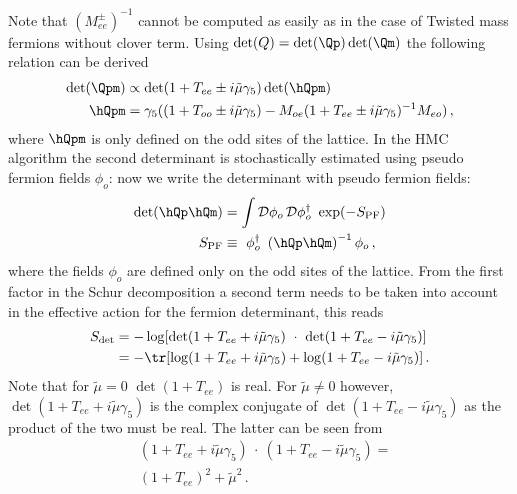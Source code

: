 Note that $(M_{ee}^\pm)^{-1}$ cannot be computed as easily as in the
case of Twisted mass fermions without clover term.
Using $\det(Q)=\det(\Qp)\det(\Qm)$ the following relation can be derived
\begin{equation}
  \label{eq:eosw4}
  \begin{split}
    \det(\Qpm) &\propto \det(1+T_{ee} \pm i\tilde\mu\gamma_5)\det(\hQpm) \\
    \hQpm &= \gamma_5((1 + T_{oo} \pm i\tilde\mu\gamma_5) -
             M_{oe}( 1 + T_{ee} \pm i\tilde\mu\gamma_5 )^{-1}M_{eo})\, ,
  \end{split}
\end{equation}
where $\hQpm$ is only defined on the odd sites of the lattice. In the
HMC algorithm the second determinant is stochastically estimated using
pseudo fermion fields $\phi_o$: now we write the determinant with
pseudo fermion fields:
\begin{equation}
  \begin{split}
    \det(\hQp \hQm) &= \int \mathcal{D}\phi_o\,\mathcal{D}\phi^\dagger_o\
    \exp(-S_\mathrm{PF})\\
    S_\mathrm{PF} &\equiv\ \phi_o^\dagger\ \left(\hQp\hQm\right)^{-1}\phi_o\, ,
  \end{split}
\end{equation}
where the fields $\phi_o$ are defined only on the odd sites of the
lattice. From the first factor in the Schur decomposition a second
term needs to be taken into account in the effective action for the
fermion determinant, this reads
\begin{equation}
  \label{eq:swdet}
  \begin{split}
    S_{\det} &=  - \log[\det(1+T_{ee} + i\tilde\mu\gamma_5)\ \cdot\ 
    \det(1+T_{ee} - i\tilde\mu\gamma_5)]\\
    &= -\tr[\log(1+T_{ee} + i\tilde\mu\gamma_5) + \log(1+T_{ee} -
    i\tilde\mu\gamma_5)]\, .\\
  \end{split}
\end{equation}
Note that for $\tilde\mu=0$  $\det(1+T_{ee})$ is real. For
$\tilde\mu\neq0$ however, $\det(1+T_{ee}+i\tilde\mu\gamma_5)$ is the
complex conjugate of $\det(1+T_{ee}-i\tilde\mu\gamma_5)$ as the
product of the two must be real. The latter can be seen from
\[
\begin{split}
  &(1+T_{ee} + i\tilde\mu\gamma_5)\ \cdot\ (1+T_{ee} -
  i\tilde\mu\gamma_5) = \\
  &(1+T_{ee})^2 + \tilde\mu^2\, .\\
\end{split}
\]
